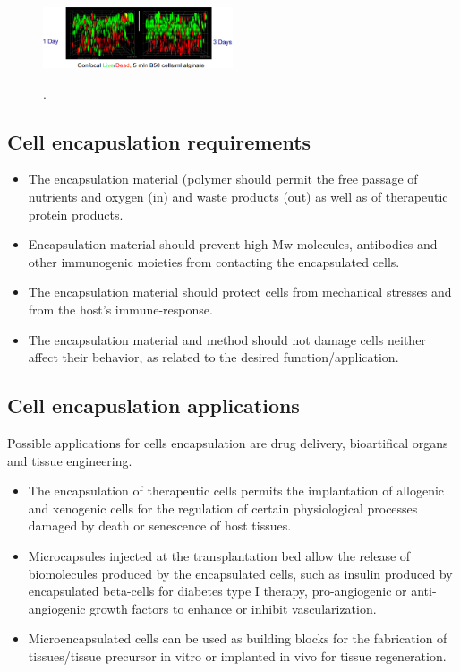     \begin{figure}[H]
        \centering
        \includegraphics[width=0.5\textwidth]{staining.png}
        \caption{\label{fig:staining}}.
\end{figure}

    \subsection{Cell encapuslation requirements}

    \begin{multicols}{2}
        \begin{itemize}
            \item The encapsulation material (polymer should permit the free passage of nutrients and oxygen (in) and waste products (out) as well as of therapeutic protein products.
            \item Encapsulation material should prevent high Mw molecules, antibodies and other immunogenic moieties from contacting the encapsulated cells.
            \item The encapsulation material should protect cells from mechanical stresses and from the host's immune-response.
            \item The encapsulation material and method should not damage cells neither affect their behavior, as related to the desired function/application.
        \end{itemize}
    \end{multicols}

    \subsection{Cell encapuslation applications}
    Possible applications for cells encapsulation are drug delivery, bioartifical organs and tissue engineering.

    \begin{multicols}{2}
        \begin{itemize}
            \item The encapsulation of therapeutic cells permits the implantation of allogenic and xenogenic cells for the regulation of certain physiological processes damaged by death or senescence of host tissues.
            \item Microcapsules injected at the transplantation bed allow the release of biomolecules produced by the encapsulated cells, such as insulin produced by encapsulated beta-cells for diabetes type I therapy, pro-angiogenic or anti-angiogenic growth factors to enhance or inhibit vascularization.
            \item Microencapsulated cells can be used as building blocks for the fabrication of tissues/tissue precursor in vitro or implanted in vivo for tissue regeneration.
        \end{itemize}
    \end{multicols}

